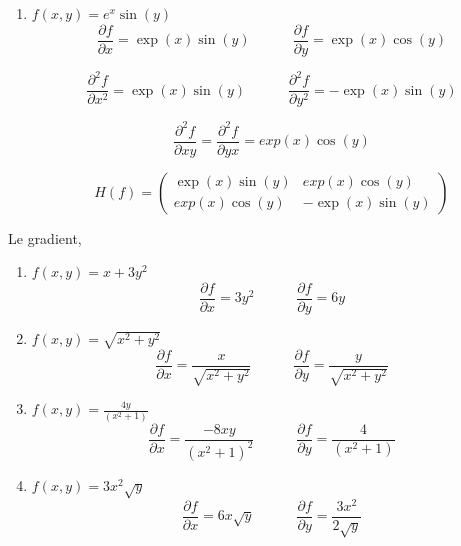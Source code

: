 \begin{solution}
\begin{enumerate}
        \item $f(x,y) =e^x\sin(y)$
        \[
        \frac{\partial f}{\partial x} = \exp(x) \sin(y) \quad \quad \quad
        \frac{\partial f}{\partial y} = \exp(x) \cos(y)
        \]
        
        \[\frac{\partial^2 f}{\partial x^2} = \exp(x) \sin(y) \quad \quad \quad
        \frac{\partial^2 f}{\partial y^2} = - \exp(x) \sin(y)
        \]
        
        \[
        \frac{\partial^2 f}{\partial xy} = \frac{\partial^2 f}{\partial yx} = exp(x) \cos(y)
        \]

        \[ H(f) = \begin{pmatrix}
        \exp(x) \sin(y) & exp(x) \cos(y)\\
        exp(x) \cos(y) & -\exp(x) \sin(y)
        \end{pmatrix}
        \]
        
    \end{enumerate}
\end{solution}

\begin{solution}
    Le gradient,
    \begin{enumerate}
        \item $f(x,y) = x + 3y^2$
        \[
        \frac{\partial f}{\partial x} = 3y^2 \quad \quad \quad
        \frac{\partial f}{\partial y} = 6y
        \]

        \item $f(x,y) = \sqrt{x^2 + y^2}$
        \[
        \frac{\partial f}{\partial x} = \frac{x}{\sqrt{x^2 + y^2}} \quad \quad \quad
        \frac{\partial f}{\partial y} = \frac{y}{\sqrt{x^2 + y^2}}
        \]

        \item $f(x,y) = \frac{4y}{(x^2 + 1)}$
        \[
        \frac{\partial f}{\partial x} = \frac{-8xy}{(x^2 + 1)^2} \quad \quad \quad
        \frac{\partial f}{\partial y} = \frac{4}{(x^2 + 1)}
        \]

        \item $f(x,y) = 3x^2 \sqrt{y}$
         \[
        \frac{\partial f}{\partial x} = 6x \sqrt{y} \quad \quad \quad
        \frac{\partial f}{\partial y} = \frac{3x^2}{2 \sqrt{y}}
        \]
        
    \end{enumerate}
\end{solution}

